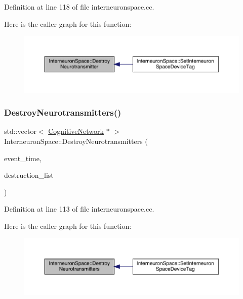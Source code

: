 Definition at line 118 of file interneuronspace.\+cc.

Here is the caller graph for this function\+:\nopagebreak
\begin{figure}[H]
\begin{center}
\leavevmode
\includegraphics[width=350pt]{class_interneuron_space_a41eb332165b0a67c3549bd73a8faa969_icgraph}
\end{center}
\end{figure}
\mbox{\label{class_interneuron_space_a9543932ffea18cce46fdfbf0fbb85b1b}} 
\subsubsection{\texorpdfstring{Destroy\+Neurotransmitters()}{DestroyNeurotransmitters()}}
{\footnotesize\ttfamily std\+::vector$<$ \hyperlink{class_cognitive_network}{Cognitive\+Network} $\ast$ $>$ Interneuron\+Space\+::\+Destroy\+Neurotransmitters (\begin{DoxyParamCaption}\item[{std\+::chrono\+::time\+\_\+point$<$ \hyperlink{universe_8h_a0ef8d951d1ca5ab3cfaf7ab4c7a6fd80}{Clock} $>$}]{event\+\_\+time,  }\item[{std\+::vector$<$ \hyperlink{class_cognitive_network}{Cognitive\+Network} $\ast$$>$}]{destruction\+\_\+list }\end{DoxyParamCaption})}



Definition at line 113 of file interneuronspace.\+cc.

Here is the caller graph for this function\+:\nopagebreak
\begin{figure}[H]
\begin{center}
\leavevmode
\includegraphics[width=350pt]{class_interneuron_space_a9543932ffea18cce46fdfbf0fbb85b1b_icgraph}
\end{center}
\end{figure}
\mbox{\label{class_interneuron_space_a4b053dc94a921c8176d9f58d40169089}} 
